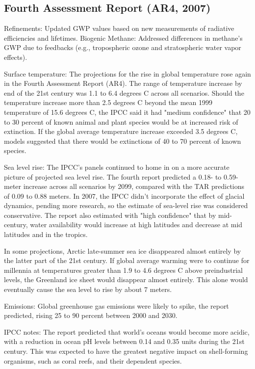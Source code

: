 \documentclass{tufte-handout}\usepackage[]{graphicx}\usepackage[]{xcolor}
\begin{document}
\subsection{Fourth Assessment Report (AR4, 2007)}
Refinements: Updated GWP values based on new measurements of radiative efficiencies and lifetimes.
Biogenic Methane: Addressed differences in methane’s GWP due to feedbacks (e.g., tropospheric ozone and stratospheric water vapor effects).

Surface temperature: The projections for the rise in global temperature rose again in the Fourth Assessment Report (AR4). The range of temperature increase by end of the 21st century was 1.1 to 6.4 degrees C across all scenarios. Should the temperature increase more than 2.5 degrees C beyond the mean 1999 temperature of 15.6 degrees C, the IPCC said it had "medium confidence" that 20 to 30 percent of known animal and plant species would be at increased risk of extinction. If the global average temperature increase exceeded 3.5 degrees C, models suggested that there would be extinctions of 40 to 70 percent of known species.

Sea level rise: The IPCC's panels continued to home in on a more accurate picture of projected sea level rise. The fourth report predicted a 0.18- to 0.59-meter increase across all scenarios by 2099, compared with the TAR predictions of 0.09 to 0.88 meters. In 2007, the IPCC didn't incorporate the effect of glacial dynamics, pending more research, so the estimate of sea-level rise was considered conservative. The report also estimated with "high confidence" that by mid-century, water availability would increase at high latitudes and decrease at mid latitudes and in the tropics.

In some projections, Arctic late-summer sea ice disappeared almost entirely by the latter part of the 21st century. If global average warming were to continue for millennia at temperatures greater than 1.9 to 4.6 degrees C above preindustrial levels, the Greenland ice sheet would disappear almost entirely. This alone would eventually cause the sea level to rise by about 7 meters.

Emissions: Global greenhouse gas emissions were likely to spike, the report predicted, rising 25 to 90 percent between 2000 and 2030.

IPCC notes: The report predicted that world's oceans would become more acidic, with a reduction in ocean pH levels between 0.14 and 0.35 units during the 21st century. This was expected to have the greatest negative impact on shell-forming organisms, such as coral reefs, and their dependent species.
\end{document}
